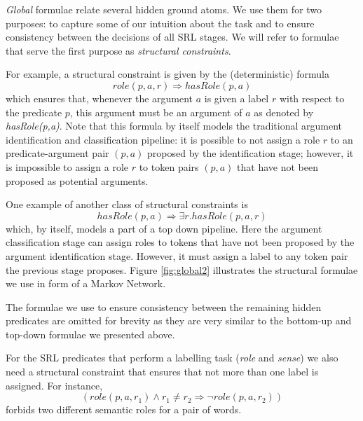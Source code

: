 
\emph{Global} formulae relate several hidden ground atoms. We use them for two purposes: to capture some of our intuition about the task and to ensure consistency between the decisions of all SRL stages. We will refer to formulae that serve the first purpose as \emph{structural constraints}. 

For example, a structural constraint is given by the (deterministic) formula
\[role(p,a,r) \Rightarrow hasRole(p,a)\]
which ensures that, whenever the argument $a$ is given a label $r$ with respect to the predicate $p$, this argument must be an argument of $a$ as denoted by \emph{hasRole(p,a)}. Note that this formula by itself models the traditional argument identification and classification pipeline: it is possible to not assign a role $r$ to an predicate-argument pair $(p,a)$ proposed by the identification stage; however, it is impossible to assign a role $r$ to token pairs $(p,a)$ that have not been proposed as potential arguments.

One example of another class of structural constraints is 
\[
hasRole(p,a)\Rightarrow\exists r.hasRole(p,a,r)
\]
which, by itself, models a part of a top down pipeline. Here the argument classification stage can assign roles to tokens that have not been proposed by the argument identification stage. However, it must assign a label to any token pair the previous stage proposes. 
Figure \ref{fig:global2} illustrates the structural formulae we use in form of a Markov Network.

The formulae we use to ensure consistency between the remaining hidden predicates are omitted for brevity as they are very similar to the bottom-up and top-down formulae we presented above.

For the SRL predicates that perform a labelling task (\emph{role} and \emph{sense}) we also need a structural constraint that ensures that not more than one label is assigned. For instance,
\[
(role(p,a,r_1) \wedge r_1 \neq r_2 \Rightarrow \neg role(p,a,r_2)  )
\]
forbids two different semantic roles for a pair of words. 


